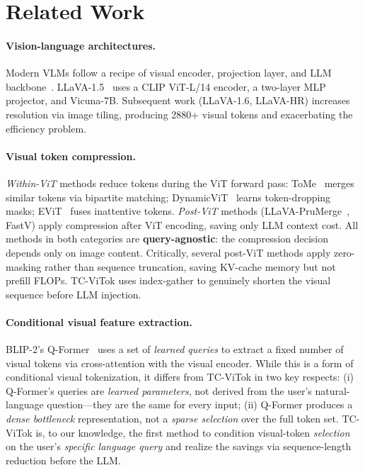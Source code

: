 \documentclass[11pt,a4paper]{article}
\begin{document}
\section{Related Work}
\label{sec:related}

\paragraph{Vision-language architectures.}
Modern VLMs follow a recipe of visual encoder, projection layer, and LLM
backbone~\citep{liu2024llava,li2023blip2,bai2023qwenvl}.
LLaVA-1.5~\citep{liu2024llava} uses a CLIP ViT-L/14 encoder, a two-layer MLP
projector, and Vicuna-7B.
Subsequent work (LLaVA-1.6, LLaVA-HR) increases resolution via image tiling,
producing 2880+ visual tokens and exacerbating the efficiency problem.

\paragraph{Visual token compression.}
\emph{Within-ViT} methods reduce tokens during the ViT forward pass:
ToMe~\citep{bolya2022token} merges similar tokens via bipartite matching;
DynamicViT~\citep{rao2021dynamicvit} learns token-dropping masks;
EViT~\citep{liang2022evit} fuses inattentive tokens.
\emph{Post-ViT} methods (LLaVA-PruMerge~\citep{shang2024llava}, FastV)
apply compression after ViT encoding, saving only LLM context cost.
All methods in both categories are \textbf{query-agnostic}: the compression
decision depends only on image content.
Critically, several post-ViT methods apply zero-masking rather than sequence
truncation, saving KV-cache memory but not prefill FLOPs.
TC-ViTok uses index-gather to genuinely shorten the visual sequence before
LLM injection.

\paragraph{Conditional visual feature extraction.}
BLIP-2's Q-Former~\citep{li2023blip2} uses a set of \emph{learned queries}
to extract a fixed number of visual tokens via cross-attention with the visual
encoder.
While this is a form of conditional visual tokenization, it differs from
TC-ViTok in two key respects:
(i) Q-Former's queries are \emph{learned parameters}, not derived from the
user's natural-language question---they are the same for every input;
(ii) Q-Former produces a \emph{dense bottleneck} representation, not a
\emph{sparse selection} over the full token set.
TC-ViTok is, to our knowledge, the first method to condition visual-token
\emph{selection} on the user's \emph{specific language query} and realize
the savings via sequence-length reduction before the LLM.
\end{document}
